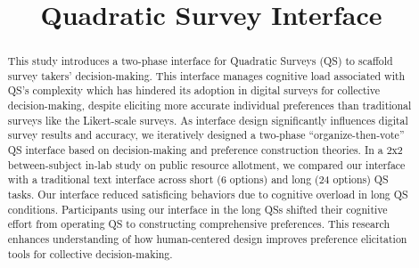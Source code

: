 \documentclass[manuscript, review, anonymous, natbib=false]{acmart}
\begin{document}

\title{Quadratic Survey Interface}











\renewcommand{\shortauthors}{Ti-Chung Cheng et al.}

\begin{abstract}
  This study introduces a two-phase interface for Quadratic Surveys (QS) to scaffold survey takers' decision-making. This interface manages cognitive load associated with QS's complexity which has hindered its adoption in digital surveys for collective decision-making, despite eliciting more accurate individual preferences than traditional surveys like the Likert-scale surveys. As interface design significantly influences digital survey results and accuracy, we iteratively designed a two-phase ``organize-then-vote'' QS interface based on decision-making and preference construction theories. In a 2x2 between-subject in-lab study on public resource allotment, we compared our interface with a traditional text interface across short (6 options) and long (24 options) QS tasks. Our interface reduced satisficing behaviors due to cognitive overload in long QS conditions. Participants using our interface in the long QSs shifted their cognitive effort from operating QS to constructing comprehensive preferences. This research enhances understanding of how human-centered design improves preference elicitation tools for collective decision-making.
\end{abstract}
\end{document}
